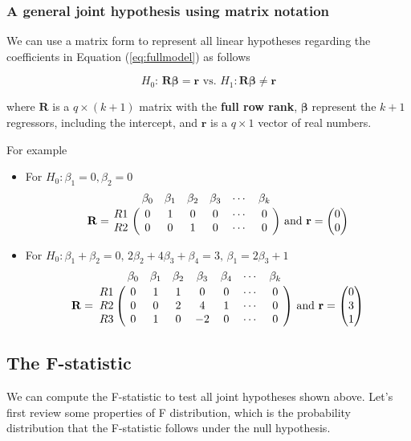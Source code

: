 \documentclass[a4paper,11pt]{article}
\begin{document}
\subsubsection*{A general joint hypothesis using matrix notation}
\label{sec:orgef519f6}

We can use a matrix form to represent all linear hypotheses regarding
the coefficients in Equation (\ref{eq:fullmodel}) as follows

\begin{equation}
\label{eq:jnt-hyp-g}
H_0:\, \mathbf{R}\boldsymbol{\beta} = \mathbf{r} \text{ vs. } H_1: \mathbf{R}\boldsymbol{\beta} \neq \mathbf{r}
\end{equation}

where \(\mathbf{R}\) is a \(q \times (k+1)\) matrix with the \textbf{full row rank},
\(\boldsymbol{\beta}\) represent the \(k+1\) regressors, including
the intercept, and \(\mathbf{r}\) is a \(q \times 1\) vector of real
numbers.

For example
\begin{itemize}
\item For \(H_0: \beta_1 = 0, \beta_2=0\)
\begin{equation*}
\mathbf{R} =
\bordermatrix{~ & \beta_0 & \beta_1 & \beta_2 & \beta_3 & \cdots & \beta_k \cr
R1 & 0 & 1 & 0 & 0 & \cdots & 0 \cr
R2 & 0 & 0 & 1 & 0 & \cdots & 0 \cr}
\text{ and }
\mathbf{r} =
\begin{pmatrix}
0 \\
0
\end{pmatrix}
\end{equation*}

\item For \(H_0: \beta_1 + \beta_2 = 0,\, 2\beta_2 + 4\beta_3 + \beta_4 =
  3,\, \beta_1 = 2 \beta_3 + 1\)
\begin{equation*}
\mathbf{R} =
\bordermatrix{~ & \beta_0 & \beta_1 & \beta_2 & \beta_3 & \beta_4 & \cdots & \beta_k \cr
R1 & 0 & 1 & 1 & 0 & 0 & \cdots & 0 \cr
R2 & 0 & 0 & 2 & 4 & 1 & \cdots & 0 \cr
R3 & 0 & 1 & 0 & -2 & 0 & \cdots & 0 \cr}
\text{ and }
\mathbf{r} =
\begin{pmatrix}
0 \\
3 \\
1
\end{pmatrix}
\end{equation*}
\end{itemize}


\subsection{The F-statistic}
\label{sec:org371a826}
We can compute the F-statistic to test all joint hypotheses shown
above. Let's first review some properties of F distribution, which is
the probability distribution that the F-statistic follows under the
null hypothesis.
\end{document}
